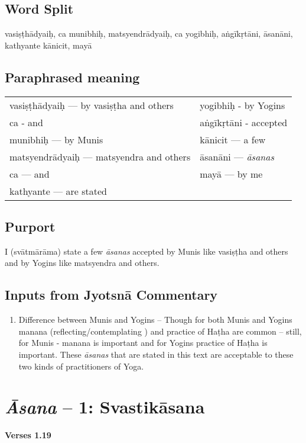 \subsection*{Word Split}

vasiṣṭhādyaiḥ, ca munibhiḥ, matsyendrādyaiḥ, ca yogibhiḥ, aṅgīkṛtāni, āsanāni, kathyante kānicit, mayā

\subsection*{Paraphrased meaning}

\begin{longtable}{>{\noindent\raggedright}p{5cm}>{\noindent\raggedright}p{5cm}}
vasiṣṭhādyaiḥ --- by vasiṣṭha and others & yogibhiḥ - by Yogins\tabularnewline
ca - and & aṅgīkṛtāni  - accepted\tabularnewline
munibhiḥ  --- by Munis & kānicit --- a few\tabularnewline
matsyendrādyaiḥ --- matsyendra and others & āsanāni --- \textit{āsanas}\tabularnewline
ca  --- and & mayā --- by me\tabularnewline
kathyante --- are stated & 
\end{longtable}

\subsection*{Purport}

I (svātmārāma) state a few \textit{āsanas} accepted by Munis like vasiṣṭha and others and by Yogins like matsyendra and others.  

\subsection*{Inputs from Jyotsnā Commentary}

\begin{enumerate}
\item Difference between Munis and Yogins – Though for both Munis and Yogins manana (reflecting/contemplating ) and practice of Haṭha are common – still, for  Munis - manana is important and for Yogins practice of Haṭha is important. These \textit{āsanas} that are stated in this text are acceptable to these two kinds of practitioners of Yoga.
\end{enumerate}

\section*{\textit{Āsana} -- 1: Svastikāsana}

\noindent \textbf{Verses 1.19}

